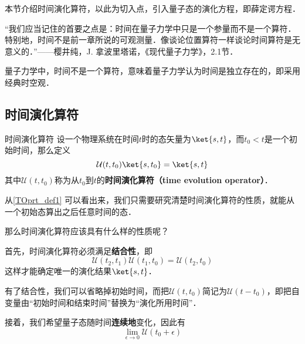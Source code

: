 


本节介绍时间演化算符，以此为切入点，引入量子态的演化方程，即薛定谔方程．


“我们应当记住的首要之点是：时间在量子力学中只是一个参量而不是一个算符．特别地，时间不是前一章所说的可观测量．像谈论位置算符一样谈论时间算符是无意义的．”——樱井纯，J. 拿波里塔诺，《现代量子力学》，2.1节．

量子力学中，时间不是一个算符，意味着量子力学认为时间是独立存在的，即采用经典时空观．


\subsection{时间演化算符}

\begin{definition}{时间演化算符}\label{TOprt_def1}
设一个物理系统在时间$t$时的态矢量为$\ket{s, t}$，而$t_0<t$是一个初始时间，那么定义
\begin{equation}
\mathcal{U}(t, t_0)\ket{s, t_0}=\ket{s, t}
\end{equation}
其中$\mathcal{U}(t, t_0)$称为从$t_0$到$t$的\textbf{时间演化算符（time evolution operator）}．
\end{definition}

从\autoref{TOprt_def1} 可以看出来，我们只需要研究清楚时间演化算符的性质，就能从一个初始态算出之后任意时间的态．

那么时间演化算符应该具有什么样的性质呢？


首先，时间演化算符必须满足\textbf{结合性}，即
\begin{equation}
\mathcal{U}(t_2, t_1)\mathcal{U}(t_1, t_0) = \mathcal{U}(t_2, t_0)
\end{equation}
这样才能确定唯一的演化结果$\ket{s, t}$．

有了结合性，我们可以省略掉初始时间，而把$\mathcal{U}(t, t_0)$简记为$\mathcal{U}(t-t_0)$，即把自变量由“初始时间和结束时间”替换为“演化所用时间”．

接着，我们希望量子态随时间\textbf{连续地}变化，因此有
\begin{equation}
\lim_{\epsilon\to 0}\mathcal{U}(t_0+\epsilon)
\end{equation}















